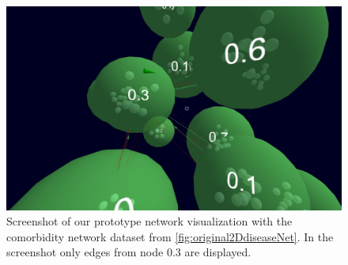 \begin{figure}[h]
    \centering
    \includegraphics[width=1\textwidth]{graphics/conceptScreenshot.jpg}
    \caption{Screenshot of our prototype network visualization with the comorbidity network dataset from \ref{fig:original2DdiseaseNet}. In the screenshot only edges from node 0.3 are displayed.} %
    \label{fig:conceptSketch} 
\end{figure}
